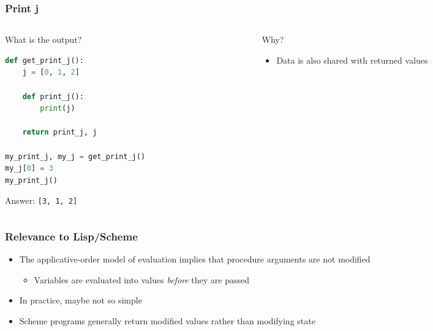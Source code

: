 \documentclass[aspectratio=169,hyperref={bookmarks=false,urlcolor=blue,colorlinks=true},10pt]{beamer}
\begin{document}
\begin{frame}[fragile]
  \frametitle{Print j}

  \begin{columns}[t]
    \begin{column}{0.55\textwidth}
      What is the output?

      \begin{lstlisting}[language=Python]
def get_print_j():
    j = [0, 1, 2]

    def print_j():
        print(j)

    return print_j, j

my_print_j, my_j = get_print_j()
my_j[0] = 3
my_print_j()
      \end{lstlisting}

      \pause

      Answer: \texttt{[3, 1, 2]}
    \end{column}
    \begin{column}{0.35\textwidth}
      Why?

      \pause

      \begin{itemize}
      \item Data is also shared with returned values
      \end{itemize}
    \end{column}
  \end{columns}
\end{frame}

\begin{frame}
  \frametitle{Relevance to Lisp/Scheme}

  \begin{itemize}
  \item The applicative-order model of evaluation implies that procedure arguments are not modified
    \begin{itemize}
    \item Variables are evaluated into values \emph{before} they are passed
    \end{itemize}
  \item In practice, maybe not so simple
  \item Scheme programs generally return modified values rather than modifying state
  \end{itemize}
\end{frame}
\end{document}
